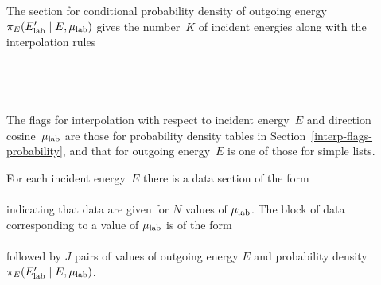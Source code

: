 The section for conditional probability density of outgoing energy
$\pi_E(E_{\text{lab}}' \mid E, \mu_{\text{lab}})$ gives the number~$K$
of incident energies along with the interpolation rules\\
  \\
  \\
  \\
  \\
The flags for interpolation with respect to incident energy~$E$ and
direction cosine~$\mu_{\text{lab}}$ are those for probability density tables in
Section~\ref{interp-flags-probability}, and that for outgoing energy~$E$ is one of those
for simple lists.

For each incident energy~$E$ there is a data section of the form\\
    \\
indicating that data are given for $N$ values of $\mu_{\text{lab}}$.  The block of
data corresponding to a value of $\mu_{\text{lab}}$ is of the form\\
    \\
followed by $J$ pairs of values of outgoing energy $E$ and
probability density~$\pi_E(E_{\text{lab}}' \mid E, \mu_{\text{lab}})$.

